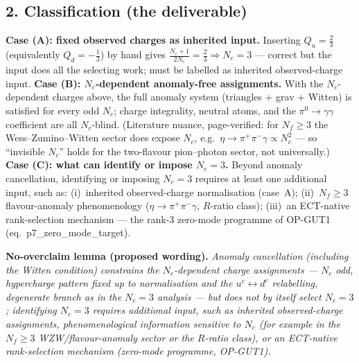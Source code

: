 \subsection*{2. Classification (the deliverable)}
\textbf{Case (A): fixed observed charges as inherited input.}
Inserting $Q_u=\tfrac23$ (equivalently $Q_d=-\tfrac13$) by hand
gives $\tfrac{N_c+1}{2N_c}=\tfrac23\Rightarrow N_c=3$ ---
correct but the input does all the selecting work; must be
labelled as inherited observed-charge input.
\textbf{Case (B): $N_c$-dependent anomaly-free assignments.}
With the $N_c$-dependent charges above, the full anomaly system
(triangles + grav + Witten) is satisfied for every odd $N_c$;
charge integrality, neutral atoms, and the $\pi^0\to\gamma\gamma$
coefficient are all $N_c$-blind.
(Literature nuance, page-verified: for $N_f\ge3$ the
Wess--Zumino--Witten sector does expose $N_c$, e.g.\
$\eta\to\pi^+\pi^-\gamma\propto N_c^2$ --- so ``invisible $N_c$''
holds for the two-flavour pion--photon sector, not universally.)
\textbf{Case (C): what can identify or impose $N_c=3$.}
Beyond anomaly cancellation, identifying or imposing $N_c=3$ requires
at least one additional input, such as:
(i)~inherited observed-charge normalisation (case~A);
(ii)~$N_f\ge3$ flavour-anomaly phenomenology
($\eta\to\pi^+\pi^-\gamma$, $R$-ratio class);
(iii)~an ECT-native rank-selection mechanism --- the rank-3
zero-mode programme of OP-GUT1 (eq.~p7\_zero\_mode\_target).

\textbf{No-overclaim lemma (proposed wording).}
\emph{Anomaly cancellation (including the Witten condition)
constrains the $N_c$-dependent charge assignments --- $N_c$ odd,
hypercharge pattern fixed up to normalisation and the
$u^c\!\leftrightarrow\!d^c$ relabelling, degenerate branch as in
the $N_c=3$ analysis --- but does not by itself select $N_c=3$;
identifying $N_c=3$ requires additional input, such as inherited
observed-charge assignments, phenomenological information sensitive
to $N_c$ (for example in the $N_f\ge3$ WZW/flavour-anomaly sector
or the $R$-ratio class), or an ECT-native rank-selection mechanism
(zero-mode programme, OP-GUT1).}

